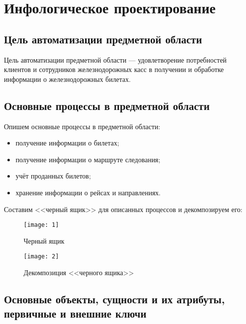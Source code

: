 \section{Инфологическое проектирование}

\subsection{Цель автоматизации предметной области}

Цель автоматизации предметной области --- удовлетворение потребностей клиентов и сотрудников железнодорожных касс в получении и обработке информации о железнодорожных билетах.\par 

\vspace{0.8cm}

\subsection{Основные процессы в предметной области}

Опишем основные процессы в предметной области:
\begin{itemize}
\item получение информации о билетах;
\item получение информации о маршруте следования;
\item учёт проданных билетов;
\item хранение информации о рейсах и направлениях.
\end{itemize}

Составим <<черный ящик>> для описанных процессов и декомпозируем его:

\begin{figure}[h!]
    \centering
    \texttt{[image: 1]}
    \caption{Черный ящик}
    \label{img:1}
\end{figure}

\clearpage

\begin{figure}[h!]
    \centering
    \texttt{[image: 2]}
    \caption{Декомпозиция <<черного ящика>>}
    \label{img:2}
\end{figure}

\subsection{Основные объекты, сущности и их атрибуты, первичные и внешние ключи}

